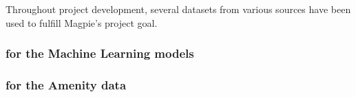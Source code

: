 Throughout project development, several datasets from various sources have been used to fulfill Magpie's project goal.
\subsubsection{for the Machine Learning models}

\subsubsection{for the Amenity data}